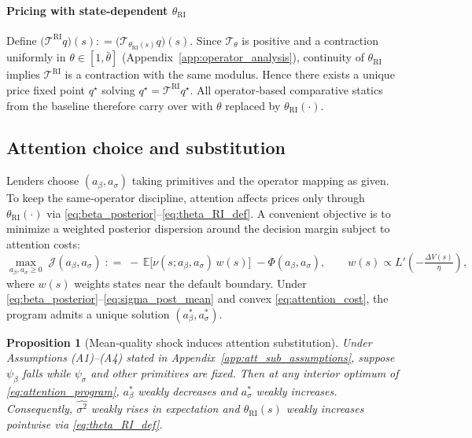\documentclass[12pt]{article}
\providecommand{\coloneqq}{\mathrel{\mathop:}=}
\theoremstyle{plain}
\newtheorem{proposition}{Proposition}
\newcommand{\E}{\mathbb{E}}
\begin{document}
\paragraph{Pricing with state‑dependent $\theta_{\mathrm{RI}}$}
Define $\big(\mathcal T^{\mathrm{RI}}q\big)(s)\coloneqq\big(\mathcal T_{\theta_{\mathrm{RI}}(s)}q\big)(s)$. Since $\mathcal T_\theta$ is positive and a contraction uniformly in $\theta\in[1,\bar\theta]$ (Appendix~\ref{app:operator_analysis}), continuity of $\theta_{\mathrm{RI}}$ implies $\mathcal T^{\mathrm{RI}}$ is a contraction with the same modulus. Hence there exists a unique price fixed point $q^\star$ solving $q^\star=\mathcal T^{\mathrm{RI}}q^\star$. All operator‑based comparative statics from the baseline therefore carry over with $\theta$ replaced by $\theta_{\mathrm{RI}}(\cdot)$.

\subsection{Attention choice and substitution}
Lenders choose $(a_\beta,a_\sigma)$ taking primitives and the operator mapping
as given. To keep the same‑operator discipline, attention affects prices only
through $\theta_{\mathrm{RI}}(\cdot)$ via
\eqref{eq:beta_posterior}–\eqref{eq:theta_RI_def}. A convenient objective is to
minimize a weighted posterior dispersion around the decision margin subject to
attention costs:
\begin{equation}\label{eq:attention_program}
	\max_{a_\beta,a_\sigma\ge 0}\;\mathcal J(a_\beta,a_\sigma)\;\coloneqq\;-\,\E\big[\nu(s;a_\beta,a_\sigma)\,w(s)\big]\;-
	\Phi(a_\beta,a_\sigma),\qquad w(s)\propto L'\!\left(-\tfrac{\Delta V(s)}{\eta}\right),
\end{equation}
where $w(s)$ weights states near the default boundary. Under \eqref{eq:beta_posterior}–\eqref{eq:sigma_post_mean} and convex \eqref{eq:attention_cost}, the program admits a unique solution $(a_\beta^*,a_\sigma^*)$.

\begin{proposition}[Mean‑quality shock induces attention substitution]\label{prop:att_sub}
	Under Assumptions (A1)–(A4) stated in Appendix~\ref{app:att_sub_assumptions}, suppose $\psi_\beta$ falls while $\psi_\sigma$ and other primitives are fixed. Then at any interior optimum of \eqref{eq:attention_program}, $a_\beta^*$ weakly decreases and $a_\sigma^*$ weakly increases. Consequently, $\widehat{\sigma^2}$ weakly rises in expectation and $\theta_{\mathrm{RI}}(s)$ weakly increases pointwise via \eqref{eq:theta_RI_def}.
\end{proposition}
\end{document}
